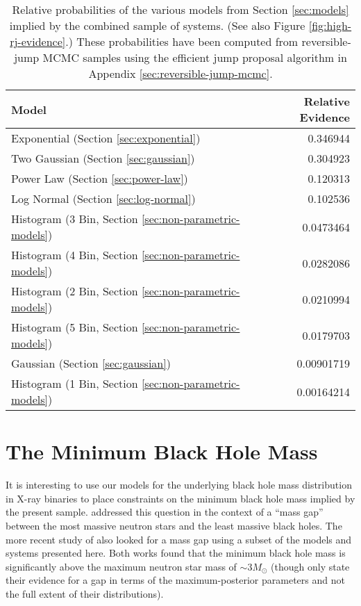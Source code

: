 \documentclass[preprint]{aastex}
\newcommand{\Msun}{M_\odot}
\begin{document}
\begin{table}
  \begin{center}
    \begin{tabular}{|l|r|}
      \hline
      Model & Relative Evidence \\
      \hline \hline
      Exponential (Section \ref{sec:exponential}) & 0.346944 \\
      \hline
      Two Gaussian (Section \ref{sec:gaussian}) & 0.304923 \\
      \hline
      Power Law (Section \ref{sec:power-law}) & 0.120313 \\
      \hline
      Log Normal (Section \ref{sec:log-normal}) & 0.102536 \\
      \hline
      Histogram (3 Bin, Section \ref{sec:non-parametric-models}) &
      0.0473464 \\
      \hline
      Histogram (4 Bin, Section \ref{sec:non-parametric-models}) &
      0.0282086 \\
      \hline 
      Histogram (2 Bin, Section \ref{sec:non-parametric-models}) &
      0.0210994 \\
      \hline 
      Histogram (5 Bin, Section \ref{sec:non-parametric-models}) &
      0.0179703  \\
      \hline      
      Gaussian (Section \ref{sec:gaussian}) & 0.00901719 \\ 
      \hline
      Histogram (1 Bin, Section \ref{sec:non-parametric-models}) &
      0.00164214 \\
      \hline
    \end{tabular}
  \end{center}
  \caption{\label{tab:rj-high} Relative probabilities of the various models
    from Section \ref{sec:models} implied by the combined sample of systems.  (See also Figure \ref{fig:high-rj-evidence}.)  These probabilities have been 
    computed from reversible-jump MCMC samples using the efficient jump proposal algorithm in Appendix \ref{sec:reversible-jump-mcmc}.}
\end{table}


\section{The Minimum Black Hole Mass}
\label{sec:minimum-mass}

It is interesting to use our models for the underlying black hole mass
distribution in X-ray binaries to place constraints on the minimum
black hole mass implied by the present sample.  \citet{Bailyn1998}
addressed this question in the context of a ``mass gap'' between the
most massive neutron stars and the least massive black holes.  The
more recent study of \citet{Ozel2010} also looked for a mass gap using
a subset of the models and systems presented here.  Both works found
that the minimum black hole mass is significantly above the maximum
neutron star mass \citep{Kalogera1996} of $\sim 3 \Msun$ (though
\citet{Ozel2010} only state their evidence for a gap in terms of the
maximum-posterior parameters and not the full extent of their
distributions).
\end{document}
